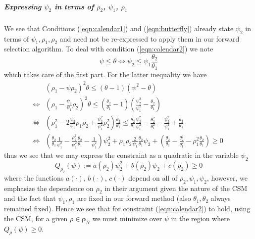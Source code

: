 \documentclass[11pt,letterpaper]{article}
\begin{document}
\subparagraph{Expressing $\psi_2$ in terms of $\rho_2$, $\psi_1$, $\rho_1$ }
\label{sss:FwdParam}
We see that Conditions (\ref{eqn:calendar1}) and (\ref{eqn:butterfly}) already state $\psi_2$ in terms of $\psi_1, \rho_1, \rho_2$ and need not be re-expressed to apply them in our  forward selection algorithm. To deal with condition (\ref{eqn:calendar2}) we note
\[
\psi \leq \theta \iff \psi_2 \leq \psi_1 \frac{ \theta_2}{\theta_1}
\]
which takes care of the first part. For the latter inequality we have
\begin{align*}
& (\rho_1 - \psi \rho_2)^2 \theta  \leq (\theta - 1)(\psi^2 - \theta) \\ 
 \iff & (\rho_1 - \frac{\psi_2}{\psi_1} \rho_2)^2 \theta  \leq ( \frac{\theta_2}{\theta_1} - 1)( \frac{\psi_2^2}{\psi_1^2} -  \frac{\theta_2}{\theta_1}  ) \\
 \iff & \left(\rho_1^2 - 2 \frac{\psi_2}{\psi_1} \rho_1\rho_2 + \frac{ \psi_2^2}{\psi_1^2} \rho_2^2 \right) \frac{\theta_2}{\theta_1}  \leq \frac{\theta_2}{\theta_1} \frac{\psi_2^2}{\psi_1^2} - \frac{ \theta_2^2 }{ \theta^2_1 } - \frac{\psi_2^2}{\psi^2_1} + \frac{\theta_2}{\theta_1} \\
 \iff & \left(  \frac{\theta_2}{\theta_1}\frac{1}{\psi_1^2} - \frac{\rho_2^2 }{\psi_1^2}\frac{\theta_2}{\theta_1} - \frac{1}{\psi_1^2} \right) \psi_2^2 +  \rho_1\rho_2 \frac{2}{\psi_1} \frac{\theta_2}{\theta_1} \psi_2 +  \left( \frac{\theta_2}{\theta_1} - \frac{\theta_2^2}{\theta_1^2} - \rho_1^2 \frac{\theta_2}{\theta_1} \right)  \geq 0 \ 
\end{align*}
thus we see that we may express the constraint as a quadratic in the variable $\psi_2$
\begin{equation}
Q_{\rho_2}(\psi) :=  a(\rho_2)\psi_2^2 + b(\rho_2)\psi_2 + c(\rho_2) \geq 0 
\label{eqn:Qcond}
\end{equation}
where the functions $a(\cdot)$, $b(\cdot)$, $c(\cdot)$ depend on all of $\rho_2, \psi_1, \psi_2$, however, we emphasize the dependence on $\rho_2$ in their argument given the nature of the CSM and the fact that $\psi_1, \rho_1$ are fixed in our forward method (also $ \theta_1, \theta_2$ always remained fixed). Hence we see that for constraint (\ref{eqn:calendar2}) to hold, using the CSM, for a given $\rho \in \pmb{\rho}_N$ we must minimize over $\psi$ in the region where $Q_{\rho}(\psi) \geq 0 $. 
\end{document}
